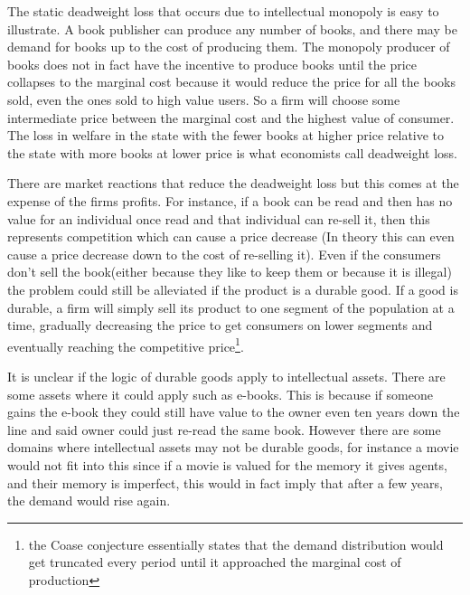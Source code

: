 The static deadweight loss that occurs due to intellectual monopoly is easy to illustrate. A book publisher can produce any number of books, and there may be demand for books up to the cost of producing them. The monopoly producer of books does not in fact have the incentive to produce books until the price collapses to the marginal cost because it would reduce the price for all the books sold, even the ones sold to high value users. So a firm will choose some intermediate price between the marginal cost and the highest value of consumer. The loss in welfare in the state with the fewer books at higher price relative to the state with more books at lower price is what economists call deadweight loss. 

There are market reactions that reduce the deadweight loss but this comes at the expense of the firms profits. For instance, if a book can be read and then has no value for an individual once read and that individual can re-sell it, then this represents competition which can cause a price decrease (In theory this can even cause a price decrease down to the cost of re-selling it). Even if the consumers don't sell the book(either because they like to keep them or because it is illegal) the problem could still be alleviated if the product is a durable good. If a good is durable, a firm will simply sell its product to one segment of the population at a time, gradually decreasing the price to get consumers on lower segments and eventually reaching the competitive price\footnote{the Coase conjecture essentially states that the demand distribution would get truncated every period until it approached the marginal cost of production}. 

It is unclear if the logic of durable goods apply to intellectual assets. There are some assets where it could apply such as e-books. This is because if someone gains the e-book they could still have value to the owner even ten years down the line and said owner could just re-read the same book. However there are some domains where intellectual assets may not be durable goods, for instance a movie would not fit into this since if a movie is valued for the memory it gives agents, and their memory is imperfect, this would in fact imply that after a few years, the demand would rise again. 


